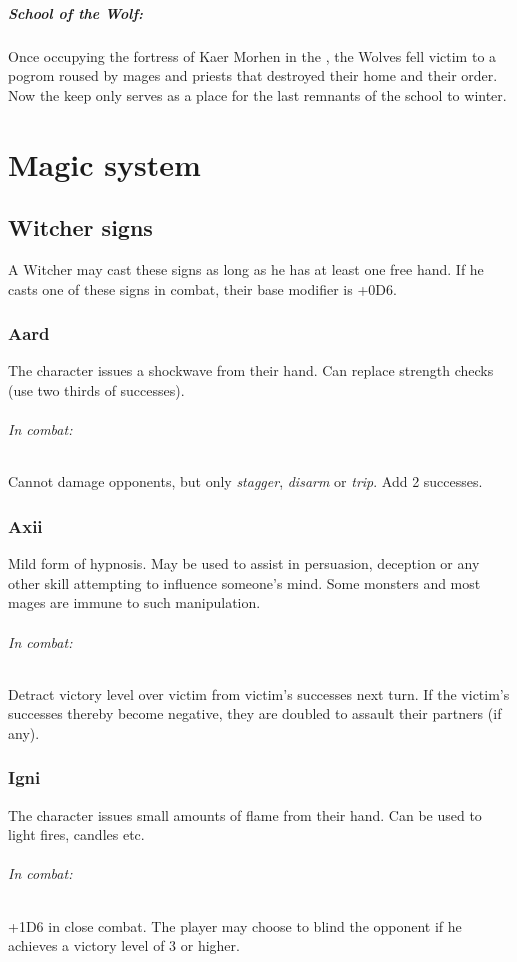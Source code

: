 \documentclass[parskip=full,11pt]{scrreport}
\begin{document}
\paragraph{School of the Wolf:}
Once occupying the fortress of Kaer Morhen in the , the Wolves fell victim to a pogrom roused by
mages and priests that destroyed their home and their order. Now the keep only serves as a place for the last remnants of 
the school to winter.

\chapter{Magic system}
\section{Witcher signs}\label{rule:signs}
A Witcher may cast these signs as long as he has at least one free hand. If he casts one of these signs in
combat, their base modifier is +0D6.

\subsection{Aard}
The character issues a shockwave from their hand. Can replace strength checks (use two thirds of successes).

\subparagraph{In combat:} Cannot damage opponents, but only \textit{stagger}, \textit{disarm} or \textit{trip}. Add 2 successes.

\subsection{Axii}
Mild form of hypnosis. May be used to assist in persuasion, deception or any other skill attempting to influence
someone's mind. Some monsters and most mages are immune to such manipulation.

\subparagraph{In combat:} Detract victory level over victim from victim's successes next turn. If the victim's
successes thereby become negative, they are doubled to assault their partners (if any).

\subsection{Igni}
The character issues small amounts of flame from their hand. Can be used to light fires, candles etc.

\subparagraph{In combat:} +1D6 in close combat. The player may choose to blind the opponent
if he achieves a victory level of 3 or higher.
\end{document}
